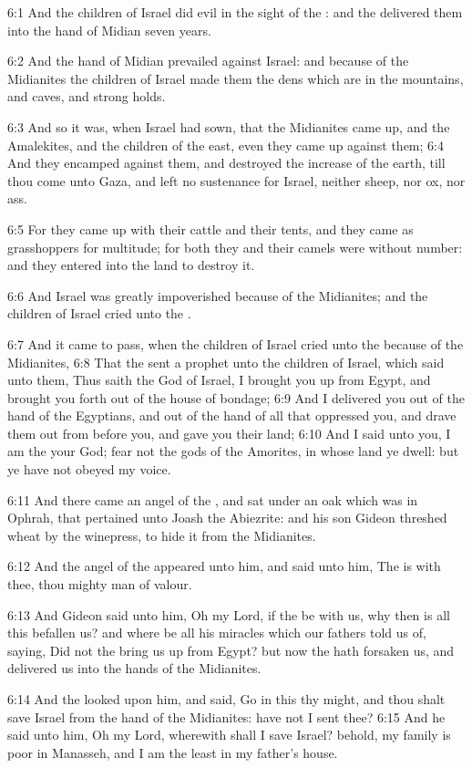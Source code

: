 6:1 And the children of Israel did evil in the sight of the \LORD: and
the \LORD delivered them into the hand of Midian seven years.

6:2 And the hand of Midian prevailed against Israel: and because of
the Midianites the children of Israel made them the dens which are in
the mountains, and caves, and strong holds.

6:3 And so it was, when Israel had sown, that the Midianites came up,
and the Amalekites, and the children of the east, even they came up
against them; 6:4 And they encamped against them, and destroyed the
increase of the earth, till thou come unto Gaza, and left no
sustenance for Israel, neither sheep, nor ox, nor ass.

6:5 For they came up with their cattle and their tents, and they came
as grasshoppers for multitude; for both they and their camels were
without number: and they entered into the land to destroy it.

6:6 And Israel was greatly impoverished because of the Midianites; and
the children of Israel cried unto the \LORD.

6:7 And it came to pass, when the children of Israel cried unto the
\LORD because of the Midianites, 6:8 That the \LORD sent a prophet unto
the children of Israel, which said unto them, Thus saith the \LORD God
of Israel, I brought you up from Egypt, and brought you forth out of
the house of bondage; 6:9 And I delivered you out of the hand of the
Egyptians, and out of the hand of all that oppressed you, and drave
them out from before you, and gave you their land; 6:10 And I said
unto you, I am the \LORD your God; fear not the gods of the Amorites,
in whose land ye dwell: but ye have not obeyed my voice.

6:11 And there came an angel of the \LORD, and sat under an oak which
was in Ophrah, that pertained unto Joash the Abiezrite: and his son
Gideon threshed wheat by the winepress, to hide it from the
Midianites.

6:12 And the angel of the \LORD appeared unto him, and said unto him,
The \LORD is with thee, thou mighty man of valour.

6:13 And Gideon said unto him, Oh my Lord, if the \LORD be with us, why
then is all this befallen us? and where be all his miracles which our
fathers told us of, saying, Did not the \LORD bring us up from Egypt?
but now the \LORD hath forsaken us, and delivered us into the hands of
the Midianites.

6:14 And the \LORD looked upon him, and said, Go in this thy might, and
thou shalt save Israel from the hand of the Midianites: have not I
sent thee?  6:15 And he said unto him, Oh my Lord, wherewith shall I
save Israel?  behold, my family is poor in Manasseh, and I am the
least in my father's house.

